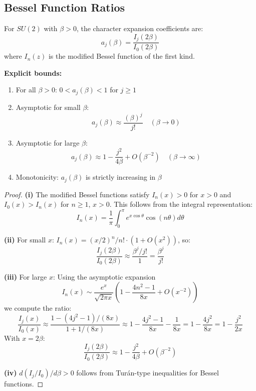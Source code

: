 \subsection{Bessel Function Ratios}

\begin{theorem}
\label{thm:bessel-bounds}
For $SU(2)$ with $\beta > 0$, the character expansion coefficients are:
\[
a_j(\beta) = \frac{I_j(2\beta)}{I_0(2\beta)}
\]
where $I_n(z)$ is the modified Bessel function of the first kind.

\textbf{Explicit bounds:}
\begin{enumerate}[label=(\roman*)]
\item For all $\beta > 0$: $0 < a_j(\beta) < 1$ for $j \geq 1$
\item Asymptotic for small $\beta$:
\[
a_j(\beta) \approx \frac{(\beta)^j}{j!} \quad (\beta \to 0)
\]
\item Asymptotic for large $\beta$:
\[
a_j(\beta) \approx 1 - \frac{j^2}{4\beta} + O(\beta^{-2}) \quad (\beta \to \infty)
\]
\item Monotonicity: $a_j(\beta)$ is strictly increasing in $\beta$
\end{enumerate}
\end{theorem}

\begin{proof}
\textbf{(i)} The modified Bessel functions satisfy $I_n(x) > 0$ for $x > 0$ and 
$I_0(x) > I_n(x)$ for $n \geq 1$, $x > 0$. This follows from the integral representation:
\[
I_n(x) = \frac{1}{\pi}\int_0^\pi e^{x\cos\theta}\cos(n\theta)d\theta
\]

\textbf{(ii)} For small $x$: $I_n(x) = (x/2)^n/n! \cdot (1 + O(x^2))$, so:
\[
\frac{I_j(2\beta)}{I_0(2\beta)} \approx \frac{\beta^j/j!}{1} = \frac{\beta^j}{j!}
\]

\textbf{(iii)} For large $x$: Using the asymptotic expansion
\[
I_n(x) \sim \frac{e^x}{\sqrt{2\pi x}} \left(1 - \frac{4n^2-1}{8x} + O(x^{-2})\right)
\]
we compute the ratio:
\[
\frac{I_j(x)}{I_0(x)} \approx \frac{1 - (4j^2-1)/(8x)}{1 + 1/(8x)} 
\approx 1 - \frac{4j^2-1}{8x} - \frac{1}{8x} = 1 - \frac{4j^2}{8x} = 1 - \frac{j^2}{2x}
\]
With $x = 2\beta$:
\[
\frac{I_j(2\beta)}{I_0(2\beta)} \approx 1 - \frac{j^2}{4\beta} + O(\beta^{-2})
\]

\textbf{(iv)} $d(I_j/I_0)/d\beta > 0$ follows from Turán-type inequalities for Bessel functions.
\end{proof}

